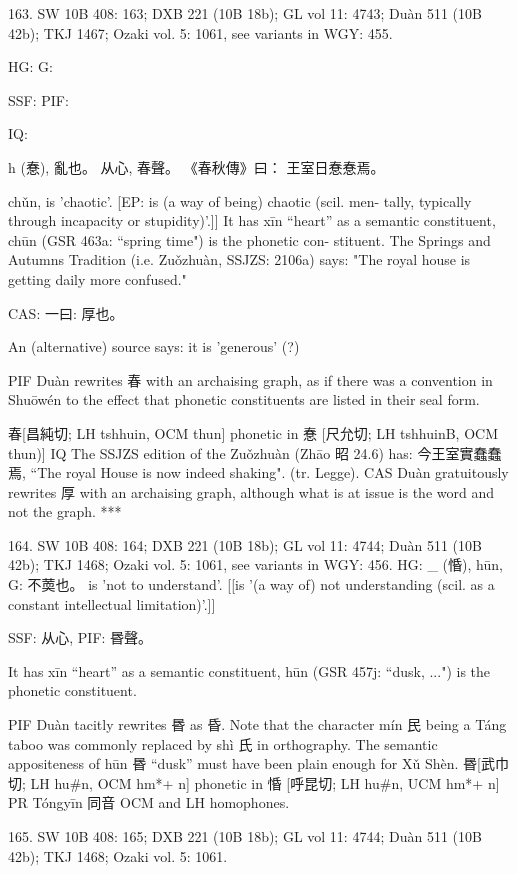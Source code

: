 163. SW 10B 408: 163; DXB 221 (10B 18b); GL vol 11: 4743; Duàn 511 (10B 42b); TKJ 1467; Ozaki vol. 5: 1061, see
variants in WGY: 455.


HG:
G:

SSF: PIF:

IQ:

h (惷),
亂也。
从心, 春聲。
《春秋傳》曰： 王室日惷惷焉。


chǔn,
is 'chaotic'. [EP: is (a way of being) chaotic (scil. men- tally, typically through incapacity or stupidity)'.]]
It has xīn ``heart'' as a semantic constituent,
chūn (GSR 463a: ``spring time") is the phonetic con- stituent.
The Springs and Autumns Tradition (i.e. Zuǒzhuàn, SSJZS: 2106a) says:
"The royal house is getting daily more confused."

CAS: 一曰:
厚也。

An (alternative) source says:
it is 'generous' (?)

PIF     Duàn rewrites 春 with an archaising graph, as if there was a convention in Shuōwén to the effect that phonetic constituents are listed in their seal form.



春[昌純切; LH tshhuin, OCM thun] phonetic in 惷 [尺允切; LH tshhuinB, OCM thun)]
IQ	The SSJZS edition of the Zuǒzhuàn (Zhāo 昭 24.6) has: 今王室實蠢蠢焉, ``The royal House is now indeed shaking". (tr. Legge).
CAS Duàn gratuitously rewrites 厚 with an archaising graph, although what is at issue is the word and not the graph.
***

164. SW 10B 408: 164; DXB 221 (10B 18b); GL vol 11: 4744; Duàn 511 (10B 42b); TKJ 1468; Ozaki vol. 5: 1061, see
variants in WGY: 456.
HG: _ (惛), hūn,
G:	不䓴也。 is 'not to understand'. [[is '(a way of) not understanding (scil. as a constant intellectual limitation)'.]]

SSF: 从心,
PIF: 昬聲。

It has xīn ``heart'' as a semantic constituent,
hūn (GSR 457j: ``dusk, ...") is the phonetic constituent.

PIF Duàn tacitly rewrites 昬 as 昏. Note that the character mín 民 being a Táng taboo was commonly replaced by shì 氏 in orthography. The semantic appositeness of hūn 昬 ``dusk'' must have been plain enough for Xǔ Shèn.
昬[武巾切; LH hu\#n, OCM hm*+ n] phonetic in 惛 [呼昆切; LH hu\#n, UCM hm*+ n]
PR   Tóngyīn 同音 OCM and LH homophones.

165. SW 10B 408: 165; DXB 221 (10B 18b); GL vol 11: 4744; Duàn 511 (10B 42b); TKJ 1468; Ozaki vol. 5: 1061.


